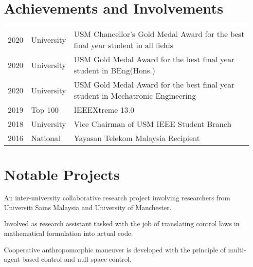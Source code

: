 \documentclass[letterpaper]{deedy-resume} %
\begin{document}
\begin{minipage}[t]{0.66\textwidth} %

\section{Achievements and Involvements}

\begin{tabular}{rlp{}}
2020	 & University & USM Chancellor's Gold Medal Award for the best final year student in all fields\\
2020	 & University & USM Gold Medal Award for the best final year student in BEng(Hons.)\\
2020	 & University & USM Gold Medal Award for the best final year student in Mechatronic Engineering\\
2019	 & Top 100 & IEEEXtreme 13.0\\
2018 	 & University & Vice Chairman of USM IEEE Student Branch\\
2016	 & National & Yayasan Telekom Malaysia Recipient\\
\end{tabular}

\sectionspace

\section{Notable Projects}

\vspace{\topsep}
\begin{tightitemize}
\item An inter-university collaborative research project involving researchers from Universiti Sains Malaysia and University of Manchester.
\item Involved as research assistant tasked with the job of translating control laws in mathematical formulation into actual code.
\item Cooperative anthropomorphic maneuver is developed with the principle of multi-agent based control and null-space control.
\end{tightitemize}
\sectionspace %


\end{minipage}
\end{document}
